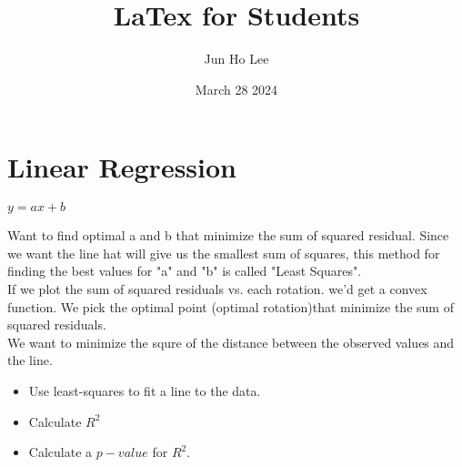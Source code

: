 \documentclass{article}
\title{LaTex for Students}
\author{Jun Ho Lee}
\date{March 28 2024}
\begin{document}
\newpage
\section{Linear Regression}

$y = ax + b$

Want to find optimal a and b that minimize the sum of squared residual. Since we want the line hat will give us the smallest sum of squares, this method for finding the best values for "a" and "b" is called "Least Squares".\\

If we plot the sum of squared residuals vs. each rotation. we'd get a convex function. We pick the optimal point (optimal rotation)that minimize the sum of squared residuals.\\

We want to minimize the squre of the distance between the observed values and the line.

\begin{itemize}
    \item{Use least-squares to fit a line to the data.}
    \item{Calculate $R^2$}
    \item{Calculate a $p-value$ for $R^2$.}
\end{itemize}



\newpage
\subsection{}
\end{document}
